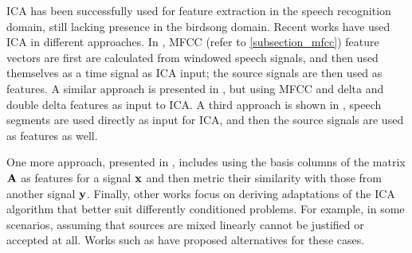 \documentclass[../main.tex]{subfiles}
\begin{document}
\par ICA has been successfully used for feature extraction in the speech recognition domain, still lacking presence in the birdsong domain. Recent works have used ICA in different approaches. In \cite{Kasprzak}, MFCC (refer to \ref{subsection_mfcc}) feature vectors are first are calculated from windowed speech signals, and then used themselves as a time signal as ICA input; the source signals are then used as features. A similar approach is presented in \cite{Hsieh2009}, but using MFCC and delta and double delta features as input to ICA. A third approach is shown in \cite{Lee2000}, speech segments are used directly as input for ICA, and then the source signals are used as features as well.
\par One more approach, presented in \cite{Jang2001}, includes using the basis columns of the matrix $\mathbf{A}$ as features for a signal $\mathbf{x}$ and then metric their similarity with those from another signal $\mathbf{y}$. Finally, other works focus on deriving adaptations of the ICA algorithm that better suit differently conditioned problems. For example, in some scenarios, assuming that sources are mixed linearly cannot be justified or accepted at all. Works such as \cite{Almeida2003, Omar} have proposed alternatives for these cases.
\end{document}

